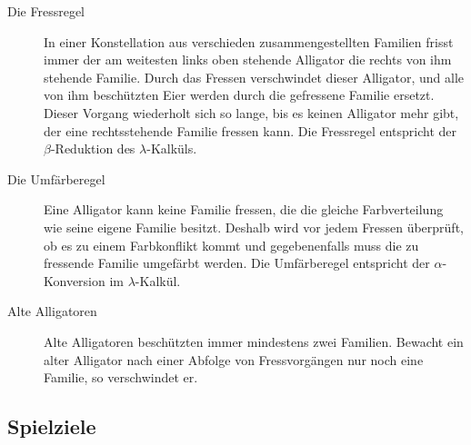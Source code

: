 	\begin{description}

		\item[Die Fressregel] In einer Konstellation aus verschieden zusammengestellten Familien frisst immer der am weitesten links oben stehende Alligator die rechts von ihm stehende Familie.
		Durch das Fressen verschwindet dieser Alligator, und alle von ihm beschützten Eier werden durch die gefressene Familie ersetzt.
		Dieser Vorgang wiederholt sich so lange, bis es keinen Alligator mehr gibt, der eine rechtsstehende Familie fressen kann.
		Die Fressregel entspricht der \(\beta\)-Reduktion des \(\lambda\)-Kalküls.

		\item[Die Umfärberegel] Eine Alligator kann keine Familie fressen, die die gleiche Farbverteilung wie seine eigene Familie besitzt.
		Deshalb wird vor jedem Fressen überprüft, ob es zu einem Farbkonflikt kommt und gegebenenfalls muss die zu fressende Familie umgefärbt werden.
		Die Umfärberegel entspricht der \(\alpha\)-Konversion im \(\lambda\)-Kalkül.

		\item[Alte Alligatoren] Alte Alligatoren beschützten immer mindestens zwei Familien.
		Bewacht ein alter Alligator nach einer Abfolge von Fressvorgängen nur noch eine Familie, so verschwindet er.

	\end{description}

\subsection{Spielziele}

